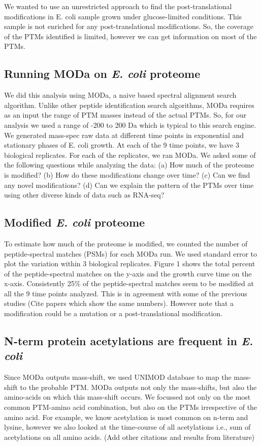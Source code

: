 \documentclass[12pt]{article}
\begin{document}
We wanted to use an unrestricted approach to find the post-translational modifications in E. coli sample grown under glucose-limited conditions. This sample is not enriched for any post-translational modifications. So, the coverage of the PTMs identified is limited, however we can get information on most of the PTMs.
 
\subsection{Running MODa on \emph{E. coli} proteome}
We did this analysis using MODa, a naive based spectral alignment search algorithm. Unlike other peptide identification search algorithms, MODa requires as an input the range of PTM masses instead of the actual PTMs. So, for our analysis we used a range of -200 to 200 Da which is typical to this search engine. We generated mass-spec raw data at different time points in exponential and stationary phases of E. coli growth.
At each of the 9 time points, we have 3 biological replicates. For each of the replicates, we ran MODa. We asked some of the following questions while analyzing the data:
(a) How much of the proteome is modified? (b) How do these modifications change over time? (c) Can we find any novel modifications? (d) Can we explain the pattern of the PTMs over time using other diverse kinds of data such as RNA-seq?

\subsection{Modified \emph{E. coli} proteome}
To estimate how much of the proteome is modified, we counted the number of peptide-spectral matches (PSMs) for each MODa run. We used standard error to plot the variation within 3 biological replicates.
Figure 1 shows the total percent of the peptide-spectral matches on the y-axis and the growth curve time on the x-axis. Consistently 25\% of the peptide-spectral matches seem to be modified at all the 9 time points analyzed.
This is in agreement with some of the previous studies (Cite papers which show the same numbers). However note that a modification could be a mutation or a post-translational modification.

\subsection{N-term protein acetylations are frequent in \emph{E. coli}}
Since MODa outputs mass-shift, we used UNIMOD database to map the mass-shift to the probable PTM. MODa outputs not only the mass-shifts, but also the amino-acids on which this mass-shift occurs. We focussed not only on the most common PTM-amino acid combination, but also on the PTMs irrespective of the amino acid. For example, we know acetylation is most common on n-term and lysine, however we also looked at the time-course of all acetylations i.e., sum of acetylations on all amino acids. (Add other citations and results from literature)
\end{document}
